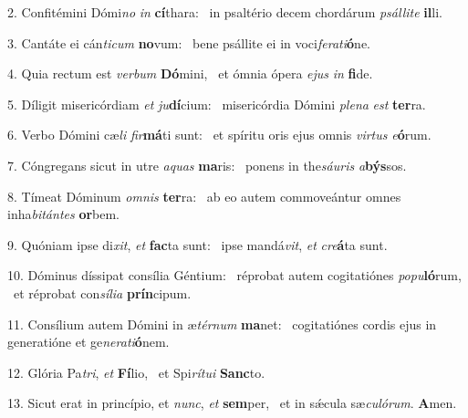 2. Confitémini Dómi\textit{no} \textit{in} \textbf{cí}thara: \ast\  in psaltério decem chordárum \textit{psál}\textit{li}\textit{te} \textbf{il}li.\

3. Cantáte ei cán\textit{ti}\textit{cum} \textbf{no}vum: \ast\  bene psállite ei in voci\textit{fe}\textit{ra}\textit{ti}\textbf{ó}ne.\

4. Quia rectum est \textit{ver}\textit{bum} \textbf{Dó}mini, \ast\  et ómnia ópera \textit{e}\textit{jus} \textit{in} \textbf{fi}de.\

5. Díligit misericórdiam \textit{et} \textit{ju}\textbf{dí}cium: \ast\  misericórdia Dómini \textit{ple}\textit{na} \textit{est} \textbf{ter}ra.\

6. Verbo Dómini cæ\textit{li} \textit{fir}\textbf{má}ti sunt: \ast\  et spíritu oris ejus omnis \textit{vir}\textit{tus} \textit{e}\textbf{ó}rum.\

7. Cóngregans sicut in utre \textit{a}\textit{quas} \textbf{ma}ris: \ast\  ponens in the\textit{sáu}\textit{ris} \textit{a}\textbf{býs}sos.\

8. Tímeat Dóminum \textit{om}\textit{nis} \textbf{ter}ra: \ast\  ab eo autem commoveántur omnes inha\textit{bi}\textit{tán}\textit{tes} \textbf{or}bem.\

9. Quóniam ipse di\textit{xit}, \textit{et} \textbf{fac}ta sunt: \ast\  ipse mandá\textit{vit}, \textit{et} \textit{cre}\textbf{á}ta sunt.\

10. Dóminus díssipat consília Géntium: \dag\  réprobat autem cogitatiónes \textit{po}\textit{pu}\textbf{ló}rum, \ast\  et réprobat con\textit{sí}\textit{li}\textit{a} \textbf{prín}cipum.\

11. Consílium autem Dómini in æ\textit{tér}\textit{num} \textbf{ma}net: \ast\  cogitatiónes cordis ejus in generatióne et ge\textit{ne}\textit{ra}\textit{ti}\textbf{ó}nem.\

12. Glória Pa\textit{tri}, \textit{et} \textbf{Fí}lio, \ast\  et Spi\textit{rí}\textit{tu}\textit{i} \textbf{Sanc}to.\

13. Sicut erat in princípio, et \textit{nunc}, \textit{et} \textbf{sem}per, \ast\  et in sǽcula sæ\textit{cu}\textit{ló}\textit{rum}. \textbf{A}men.\

